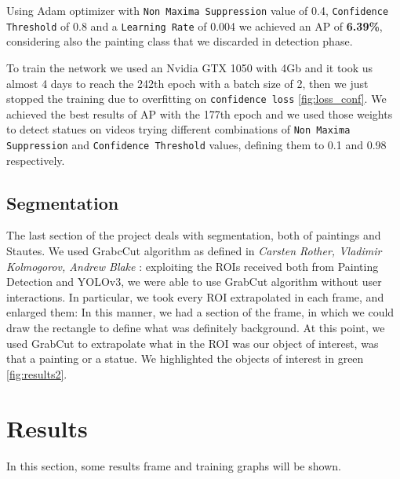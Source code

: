\documentclass[10pt,twocolumn,letterpaper]{article}
\begin{document}
Using Adam optimizer with {\tt Non Maxima Suppression} value of 0.4, {\tt Confidence Threshold} of 0.8 
and a {\tt Learning Rate} of 0.004 we achieved an AP of {\bf 6.39\%}, considering also the painting class that we 
discarded in detection phase. 

To train the network we used an Nvidia GTX 1050 with 4Gb and it took us almost 4 days to
reach the 242th epoch with a batch size of 2, then we just stopped the training due to overfitting on 
{\tt confidence loss} \ref{fig:loss_conf}. 
We achieved the best results of AP with the 177th epoch and we used those weights to detect
statues on videos trying different combinations of {\tt Non Maxima Suppression} and {\tt Confidence Threshold} values,
defining them to 0.1 and 0.98 respectively.

\subsection{Segmentation}
The last section of the project deals with segmentation, both of paintings and Stautes.
We used GrabcCut algorithm as defined in \textit{Carsten Rother, Vladimir Kolmogorov, Andrew Blake} \cite{grabcut}
: exploiting the ROIs received both from Painting Detection and YOLOv3, we were able to use GrabCut algorithm without user interactions.
In particular, we took every ROI extrapolated in each frame, and enlarged them: In this manner, we had a section of the frame, in which we could draw the rectangle to define what was definitely background.
At this point, we used GrabCut to extrapolate what in the ROI was our object of interest, was that a painting or a statue.
We highlighted the objects of interest in green \ref{fig:results2}.

\section{Results}

In this section, some results frame and training graphs will be shown.
\end{document}

